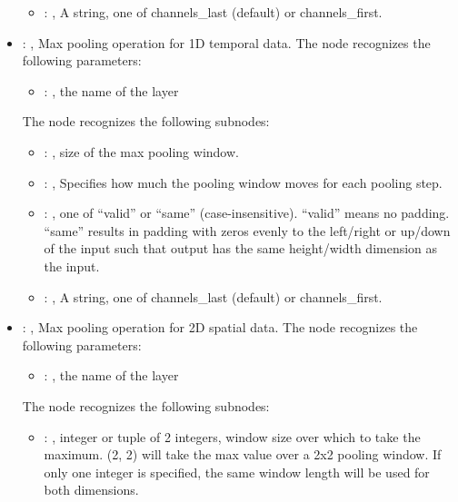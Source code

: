 \begin{itemize}
\begin{itemize}
        \item {}: , 
          A string, one of channels\_last (default) or channels\_first.
      \end{itemize}

    \item {}: , 
      Max pooling operation for 1D temporal data.
      The  node recognizes the following parameters:
        \begin{itemize}
          \item {}: , 
            the name of the layer
      \end{itemize}

      The  node recognizes the following subnodes:
      \begin{itemize}
        \item {}: , 
          size of the max pooling window.

        \item {}: , 
          Specifies how much the pooling window moves for each pooling step.

        \item {}: , 
          one of ``valid'' or ``same'' (case-insensitive). ``valid'' means no padding. ``same''
          results in padding         with zeros evenly to the left/right or up/down of the input
          such that output has the same height/width         dimension as the input.

        \item {}: , 
          A string, one of channels\_last (default) or channels\_first.
      \end{itemize}

    \item {}: , 
      Max pooling operation for 2D spatial data.
      The  node recognizes the following parameters:
        \begin{itemize}
          \item {}: , 
            the name of the layer
      \end{itemize}

      The  node recognizes the following subnodes:
      \begin{itemize}
        \item {}: , 
          integer or tuple of 2 integers, window size over which to take the maximum. (2, 2) will
          take the max         value over a 2x2 pooling window. If only one integer is specified,
          the same window length will be used for         both dimensions.


\end{itemize}
\end{itemize}
